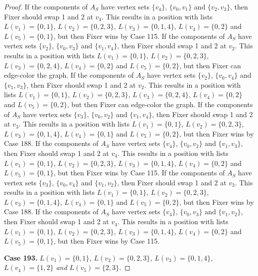\documentclass[12pt]{amsart}
\theoremstyle{plain}
\theoremstyle{definition}
\theoremstyle{remark}
\begin{document}
\begin{proof}
If the components of $A_S$ have vertex sets $\{v_4\}$, $\{v_0, v_1\}$ and $\{v_2, v_3\}$, then Fixer should swap 1 and 2 at $v_4$. This results in a position with lists $L(v_1) = \{0, 1\}$, $L(v_2) = \{0, 2, 3\}$, $L(v_3) = \{0, 1, 4\}$, $L(v_4) = \{0, 2\}$ and $L(v_5) = \{0, 1\}$, but then Fixer wins by Case 115.
If the components of $A_S$ have vertex sets $\{v_2\}$, $\{v_0, v_3\}$ and $\{v_1, v_4\}$, then Fixer should swap 1 and 2 at $v_2$. This results in a position with lists $L(v_1) = \{0, 1\}$, $L(v_2) = \{0, 2, 3\}$, $L(v_3) = \{0, 2, 4\}$, $L(v_4) = \{0, 2\}$ and $L(v_5) = \{0, 2\}$, but then Fixer can edge-color the graph.
If the components of $A_S$ have vertex sets $\{v_2\}$, $\{v_0, v_4\}$ and $\{v_1, v_3\}$, then Fixer should swap 1 and 2 at $v_2$. This results in a position with lists $L(v_1) = \{0, 1\}$, $L(v_2) = \{0, 2, 3\}$, $L(v_3) = \{0, 2, 4\}$, $L(v_4) = \{0, 2\}$ and $L(v_5) = \{0, 2\}$, but then Fixer can edge-color the graph.
If the components of $A_S$ have vertex sets $\{v_3\}$, $\{v_0, v_2\}$ and $\{v_1, v_4\}$, then Fixer should swap 1 and 2 at $v_3$. This results in a position with lists $L(v_1) = \{0, 1\}$, $L(v_2) = \{0, 2, 3\}$, $L(v_3) = \{0, 1, 4\}$, $L(v_4) = \{0, 1\}$ and $L(v_5) = \{0, 2\}$, but then Fixer wins by Case 188.
If the components of $A_S$ have vertex sets $\{v_4\}$, $\{v_0, v_2\}$ and $\{v_1, v_3\}$, then Fixer should swap 1 and 2 at $v_4$. This results in a position with lists $L(v_1) = \{0, 1\}$, $L(v_2) = \{0, 2, 3\}$, $L(v_3) = \{0, 1, 4\}$, $L(v_4) = \{0, 2\}$ and $L(v_5) = \{0, 1\}$, but then Fixer wins by Case 115.
If the components of $A_S$ have vertex sets $\{v_3\}$, $\{v_0, v_4\}$ and $\{v_1, v_2\}$, then Fixer should swap 1 and 2 at $v_3$. This results in a position with lists $L(v_1) = \{0, 1\}$, $L(v_2) = \{0, 2, 3\}$, $L(v_3) = \{0, 1, 4\}$, $L(v_4) = \{0, 1\}$ and $L(v_5) = \{0, 2\}$, but then Fixer wins by Case 188.
If the components of $A_S$ have vertex sets $\{v_4\}$, $\{v_0, v_3\}$ and $\{v_1, v_2\}$, then Fixer should swap 1 and 2 at $v_4$. This results in a position with lists $L(v_1) = \{0, 1\}$, $L(v_2) = \{0, 2, 3\}$, $L(v_3) = \{0, 1, 4\}$, $L(v_4) = \{0, 2\}$ and $L(v_5) = \{0, 1\}$, but then Fixer wins by Case 115.

\noindent\textbf{Case 193.  }\textit{$L(v_1) = \{0, 1\}$, $L(v_2) = \{0, 2, 3\}$, $L(v_3) = \{0, 1, 4\}$, $L(v_4) = \{1, 2\}$ and $L(v_5) = \{2, 3\}$.}


\end{proof}
\end{document}
